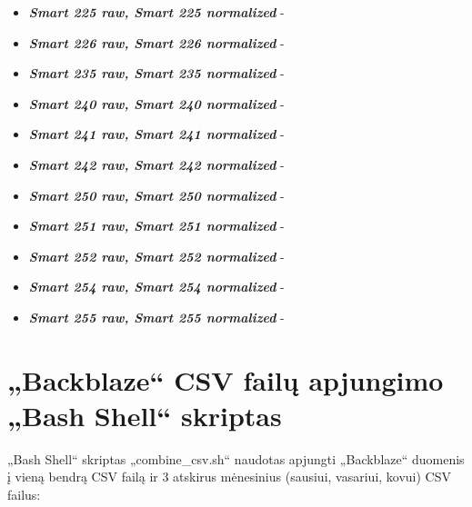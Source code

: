 \documentclass{VUMIFPSkursinis}
\begin{document}
\begin{itemize}
\item \textit{\textbf{Smart 225 raw, Smart 225 normalized}} - 
\item \textit{\textbf{Smart 226 raw, Smart 226 normalized}} - 
\item \textit{\textbf{Smart 235 raw, Smart 235 normalized}} - 
\item \textit{\textbf{Smart 240 raw, Smart 240 normalized}} - 
\item \textit{\textbf{Smart 241 raw, Smart 241 normalized}} - 
\item \textit{\textbf{Smart 242 raw, Smart 242 normalized}} - 
\item \textit{\textbf{Smart 250 raw, Smart 250 normalized}} - 
\item \textit{\textbf{Smart 251 raw, Smart 251 normalized}} - 
\item \textit{\textbf{Smart 252 raw, Smart 252 normalized}} - 
\item \textit{\textbf{Smart 254 raw, Smart 254 normalized}} - 
\item \textit{\textbf{Smart 255 raw, Smart 255 normalized}} - 
\end{itemize}

\section{„Backblaze“ CSV failų apjungimo „Bash Shell“ skriptas} \label{sec:skriptas}
„Bash Shell“ skriptas „combine\_csv.sh“ naudotas apjungti „Backblaze“ duomenis į vieną bendrą CSV failą ir 3 atskirus mėnesinius (sausiui, vasariui, kovui) CSV failus:\par

\noindent{}\par
\end{document}
